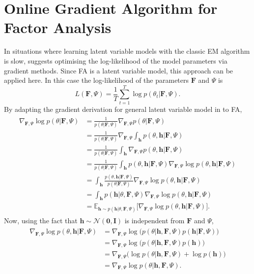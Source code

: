 \documentclass[msc,deptreport.inf]{infthesis} %
\newcommand{\matr}[1]{\mathbf{#1}}
\newcommand{\E}{\mathbb E}
\begin{document}
\section{Online Gradient Algorithm for Factor Analysis}\label{sec:gradient_fa}

In situations where learning latent variable models with the classic EM algorithm is slow, \cite{barber2007} suggests optimising the log-likelihood of the model parameters via gradient methods. Since FA is a latent variable model, this approach can be applied here. In this case the log-likelihood of the parameters $\matr{F}$ and $\Psi$ is 
\begin{equation}
	L(\matr{F}, \Psi) = \frac{1}{T} \sum_{t=1}^T \log p(\theta_t | \matr{F}, \Psi).
\end{equation}
By adapting the gradient derivation for general latent variable model in \cite{barber2007} to FA, 
\begin{align}\label{eqn:grad_log_likelihood}
\begin{split}
	\nabla_{\matr{F}, \Psi} \log p(\theta | \matr{F}, \Psi) 
	& = \frac{1}{p(\theta | \matr{F}, \Psi)} \nabla_{\matr{F}, \Psi} p(\theta | \matr{F}, \Psi) \\
	& = \frac{1}{p(\theta | \matr{F}, \Psi)} \nabla_{\matr{F}, \Psi} \int_\matr{h} p(\theta, \matr{h} | \matr{F}, \Psi) \\
	& = \frac{1}{p(\theta | \matr{F}, \Psi)} \int_\matr{h} \nabla_{\matr{F}, \Psi} p(\theta, \matr{h} | \matr{F}, \Psi) \\
	& = \frac{1}{p(\theta | \matr{F}, \Psi)} \int_\matr{h} p(\theta, \matr{h} | \matr{F}, \Psi) \nabla_{\matr{F}, \Psi} \log p(\theta, \matr{h} | \matr{F}, \Psi) \\
	& = \int_\matr{h} \frac{p(\theta, \matr{h} | \matr{F}, \Psi)}{p(\theta | \matr{F}, \Psi)} \nabla_{\matr{F}, \Psi} \log p(\theta, \matr{h} | \matr{F}, \Psi) \\
	& = \int_\matr{h} p(\matr{h} | \theta, \matr{F}, \Psi) \nabla_{\matr{F}, \Psi} \log p(\theta, \matr{h} | \matr{F}, \Psi) \\
	& = \E_{\matr{h} \sim p(\matr{h} | \theta, \matr{F}, \Psi)} \big[ \nabla_{\matr{F}, \Psi} \log p(\theta, \matr{h} | \matr{F}, \Psi) \big].
\end{split}
\end{align}
Now, using the fact that $\matr{h} \sim \mathcal{N}(\matr{0}, \matr{I})$ is independent from $\matr{F}$ and $\Psi$,
\begin{align}\label{eqn:grad_log_complete_likelihood}
\begin{split}
	\nabla_{\matr{F}, \Psi} \log p(\theta, \matr{h} | \matr{F}, \Psi)
	& = \nabla_{\matr{F}, \Psi} \log \big(p(\theta | \matr{h}, \matr{F}, \Psi)p(\matr{h} | \matr{F}, \Psi)\big) \\
	& = \nabla_{\matr{F}, \Psi} \log \big(p(\theta | \matr{h}, \matr{F}, \Psi)p(\matr{h})\big) \\
	& = \nabla_{\matr{F}, \Psi} \big( \log p(\theta | \matr{h}, \matr{F}, \Psi) + \log p(\matr{h})\big) \\
	& = \nabla_{\matr{F}, \Psi} \log p(\theta | \matr{h}, \matr{F}, \Psi).
\end{split}
\end{align}
\end{document}
